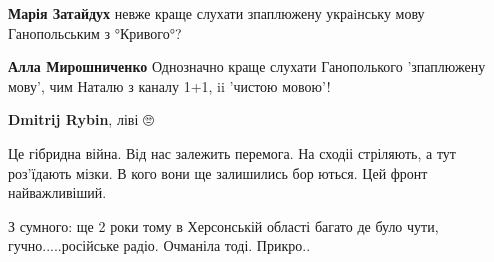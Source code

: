 \begin{itemize}
\begin{itemize}
 
\textbf{Марія Затайдух} невже краще слухати зпаплюжену украiнську мову Ганопольським з °Кривого°?

 
\textbf{Алла Мирошниченко} Однозначно краще слухати Ганополького 'зпаплюжену мову', чим Наталю з каналу 1+1, ii 'чистою мовою'!

 
\textbf{Dmitrij Rybin}, ліві 🙄

 

Це гібридна війна. Від нас залежить перемога. На сходіі стріляють, а тут
роз'їдають мізки. В кого вони ще залишились бор ються. Цей фронт найважливіший.

\end{itemize}

 
З сумного: ще 2 роки тому в Херсонській області багато де було чути, гучно.....російське радіо. Очманіла тоді. Прикро..

 

\end{itemize}
